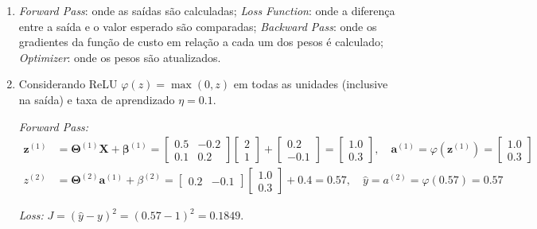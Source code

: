 \documentclass{dlproblemset}
\begin{document}
\begin{enumerate}[1)]
    \item \textit{Forward Pass}: onde as saídas são calculadas; \textit{Loss Function}: onde a diferença entre a saída e o valor esperado são comparadas; \textit{Backward Pass}: onde os gradientes da função de custo em relação a cada um dos pesos é calculado; \textit{Optimizer}: onde os pesos são atualizados.

    \item Considerando ReLU $\varphi(z)=\max(0,z)$ em todas as unidades (inclusive na saída) e taxa de aprendizado $\eta = 0.1$.

    \textit{Forward Pass:}
    \begin{align*}
        \mathbf{z}^{(1)} &= \mathbf{\Theta}^{(1)}\mathbf{X} + \boldsymbol{\beta}^{(1)} = \begin{bmatrix}0.5 & -0.2\\ 0.1 & 0.2\end{bmatrix}\begin{bmatrix}2\\ 1\end{bmatrix} + \begin{bmatrix}0.2\\ -0.1\end{bmatrix} = \begin{bmatrix}1.0\\ 0.3\end{bmatrix}, \quad \mathbf{a}^{(1)}=\varphi(\mathbf{z}^{(1)})=\begin{bmatrix}1.0\\ 0.3\end{bmatrix}\\
        z^{(2)} &= \mathbf{\Theta}^{(2)}\mathbf{a}^{(1)} + \beta^{(2)} = \begin{bmatrix}0.2 & -0.1\end{bmatrix}\begin{bmatrix}1.0\\ 0.3\end{bmatrix} + 0.4 = 0.57, \quad \hat{y}=a^{(2)}=\varphi(0.57)=0.57
    \end{align*}

    \textit{Loss:} $J=(\hat{y}-y)^2 = (0.57-1)^2 = 0.1849$.


\end{enumerate}
\end{document}
